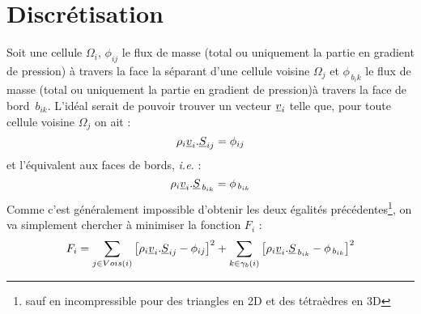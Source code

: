 %
% 
%
% 
% 
% 
%
%

\section{Discr\'etisation}
Soit une cellule $\Omega_i$, $\phi_{ij}$  le flux de masse (total ou uniquement la partie en
gradient de pression) \`a travers la face la
s\'eparant d'une cellule voisine $\Omega_j$ et $\phi_{\,b_ik}$ le flux de masse (total ou uniquement la partie en
gradient de pression)\`a travers la face de bord $\,b_{ik}$.
L'id\'eal serait de pouvoir trouver un vecteur $\underline{v}_i$ telle que, pour toute cellule voisine $\Omega_j$ on ait :
\begin{equation}
\rho_i\underline{v}_i.\underline{S}_{ij} = \phi_{ij}
\end{equation}
et l'\'equivalent aux faces de bords, {\it i.e.} :
\begin{equation}
\rho_i \underline{v}_i.\underline{S}_{\,b_{ik}} = \phi_{\,b_{ik}}
\end{equation}
Comme c'est g\'en\'eralement impossible d'obtenir les deux \'egalit\'es pr\'ec\'edentes\footnote{%
sauf en incompressible pour des triangles en 2D et des
t\'etra\`edres en 3D}, on va simplement chercher \`a minimiser la fonction $F_i$ :
\begin{equation}
F_i=\sum\limits_{j\in Vois(i)}\left[
\rho_i\underline{v}_i.\underline{S}_{ij}-\phi_{ij}\right]^2 + \sum\limits_{k\in {\gamma_b(i)}}\left[\rho_i\underline{v}_i.\underline{S}_{\,b_{ik}}-\phi_{\,b_{ik}}\right]^2
\end{equation}

